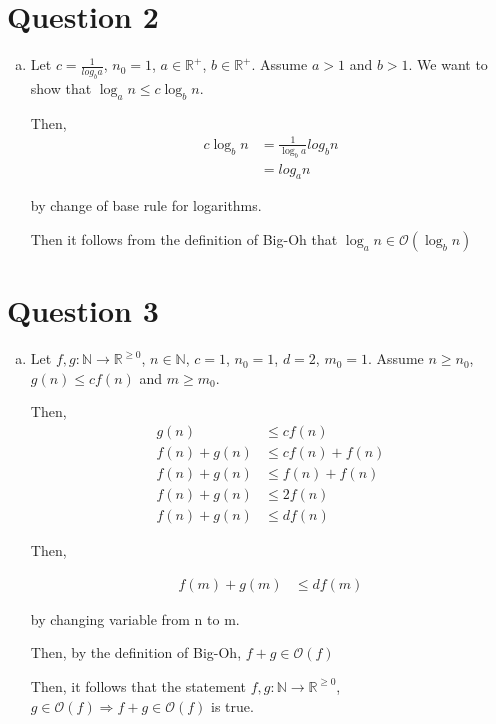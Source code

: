 \documentclass[12pt]{article}
\begin{document}
\section*{Question 2}
\begin{enumerate}[a.]
    \item

    Let $c = \frac{1}{log_b a}$, $n_0 = 1$, $a \in \mathbb{R}^{+}$, $b \in \mathbb{R}^{+}$.
    Assume $a > 1$ and $b > 1$. We want to show that $\log_a n \leq c \log_b n$.

    \bigskip

    Then,
    \setcounter{equation}{0}
    \begin{align}
        c \log_b n &= \frac{1}{\log_b a} log_b n\\
        &= log_a n
    \end{align}

    by change of base rule for logarithms.

    \bigskip

    Then it follows from the definition of Big-Oh that $\log_a n \in \mathcal{O}(\log_b n)$

\end{enumerate}

\section*{Question 3}
\begin{enumerate}[a.]
    \item

    Let $f,g: \mathbb{N} \to \mathbb{R}^{\geq 0}$, $n \in \mathbb{N}$, $c = 1$,
    $n_0 = 1$, $d = 2$, $m_0 = 1$. Assume $n \geq n_0$, $g(n) \leq c f(n)$ and
    $m \geq m_0$.

    \bigskip

    Then,
    \setcounter{equation}{0}
    \begin{align}
        g(n) &\leq c f(n)\\
        f(n) + g(n) &\leq c f(n) + f(n)\\
        f(n) + g(n) &\leq f(n) + f(n)\\
        f(n) + g(n) &\leq 2 f(n)\\
        f(n) + g(n) &\leq d f(n)
    \end{align}

    \bigskip

    Then,

    \begin{align}
        f(m) + g(m) &\leq d f(m)
    \end{align}

    by changing variable from n to m.

    \bigskip

    Then, by the definition of Big-Oh, $f +g \in \mathcal{O}(f)$

    \bigskip

    Then, it follows that the statement $f,g: \mathbb{N} \to \mathbb{R}^{\geq 0}$,
    $g \in \mathcal{O}(f) \Rightarrow f + g \in \mathcal{O}(f)$ is true.
\end{enumerate}
\end{document}

